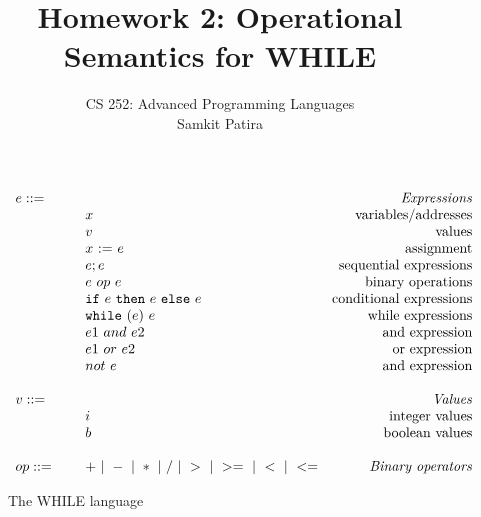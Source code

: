 \documentclass{article}
\title{Homework 2: Operational Semantics for WHILE}
\author{
  CS 252: Advanced Programming Languages \\
  Samkit Patira \\
  }
\newcommand{\rel}[1]{ \mbox{\sc [#1]} }
\begin{document}
\maketitle

\newcommand{\mydefhead}[2]{\multicolumn{2}{l}{{#1}}&\mbox{\emph{#2}}\\}
\newcommand{\mydefcase}[2]{\qquad\qquad& #1 &\mbox{#2}\\}

\newcommand{\assign}[2]{#1~{:=}~#2}
\newcommand{\ife}[3]{\mbox{\tt if}~{#1}~\mbox{\tt then}~{#2}~\mbox{\tt else}~{#3}}
\newcommand{\whilee}[2]{\mbox{\tt while}~(#1)~#2}
\newcommand{\true}{\mbox{\tt true}}
\newcommand{\false}{\mbox{\tt false}}

\begin{figure}\label{fig:lang}
\caption{The WHILE language}
\[
\begin{array}{llr}
  \mydefhead{e ::=\qquad\qquad\qquad\qquad}{Expressions}
  \mydefcase{x}{variables/addresses}
  \mydefcase{v}{values}
  \mydefcase{\assign x e}{assignment}
  \mydefcase{e; e}{sequential expressions}
  \mydefcase{e ~op~ e}{binary operations}
  \mydefcase{\ife e e e}{conditional expressions}
  \mydefcase{\whilee e e}{while expressions}
  \mydefcase{ e1~and~e2}{and expression}
  \mydefcase{e1~or~e2}{or expression}
  \mydefcase{not ~ e}{and expression}
  
  \\
  \mydefhead{v ::=\qquad\qquad\qquad\qquad}{Values}
  \mydefcase{i}{integer values}
  \mydefcase{b}{boolean values}
  \\
  op ::= & + ~|~ - ~|~ * ~|~ / ~|~ > ~|~ >= ~|~ < ~|~ <=  & \mbox{\emph{Binary operators}} \\
\end{array}
\]
\end{figure}



\newcommand{\ssrule}[3]
{
  \rel{#1} &
  \frac{\strut\begin{array}{@{}c@{}} #2 \end{array}}
       {\strut\begin{array}{@{}c@{}} #3 \end{array}}
   \\~\\
}
\clearpage
\end{document}
